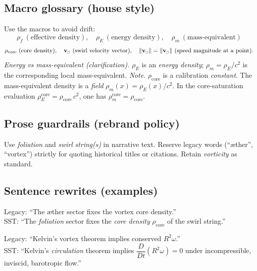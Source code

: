 \documentclass[11pt]{article}
\newcommand{\swirlarrow}{%
	\mathchoice{\mkern-2mu\scriptstyle\boldsymbol{\circlearrowleft}}%
	{\mkern-2mu\scriptstyle\boldsymbol{\circlearrowleft}}%
	{\mkern-2mu\scriptscriptstyle\boldsymbol{\circlearrowleft}}%
	{\mkern-2mu\scriptscriptstyle\boldsymbol{\circlearrowleft}}%
}
\newcommand{\vswirl}{\mathbf{v}_{\swirlarrow}}
\newcommand{\vnorm}{\lVert \mathbf{v}_{\mkern-2mu\scriptscriptstyle\boldsymbol{\circlearrowleft}} \rVert}               %
\newcommand{\rhoF}{\rho_{\!f}}                           %
\newcommand{\rhoE}{\rho_{\!E}}                           %
\newcommand{\rhoM}{\rho_{\!m}}                           %
\newcommand{\rhoC}{\rho_{\mathrm{core}}}                 %
\newcommand{\CoreSaturationNote}{%
	\textit{Note.} \(\rho_{\mathrm{core}}\) is a calibration \emph{constant}. The mass-equivalent density is a \emph{field} \(\rho_{\!m}(x)=\rho_{\!E}(x)/c^2\).
	In the core-saturation evaluation \(\rho_{\!E}^{\text{core}}=\rho_{\mathrm{core}}\,c^2\), one has \(\rho_{\!m}^{\text{core}}=\rho_{\mathrm{core}}\).}
\begin{document}
    \subsection*{Macro glossary (house style)}
        Use the macros to avoid drift:
        \[
            \rhoF\ (\text{effective density}),\quad
            \rhoE\ (\text{energy density}),\quad
            \rhoM\ (\text{mass-equivalent})
        \]\[
              \rhoC\ (\text{core density}),\quad
              \vswirl\ (\text{swirl velocity vector}),\quad
              \vnorm=\lVert\vswirl\rVert\ (\text{speed magnitude at a point}) .
    \]
        \medskip
        \noindent\textit{Energy vs mass-equivalent (clarification).} \(\rhoE\) is an \emph{energy density}; \(\rhoM=\rhoE/c^2\) is the corresponding local mass-equivalent. \CoreSaturationNote

    \subsection*{Prose guardrails (rebrand policy)}
        Use \emph{foliation} and \emph{swirl string(s)} in narrative text. Reserve legacy words (``æther'', ``vortex'') strictly for quoting historical titles or citations. Retain \emph{vorticity} as standard.

    \subsection*{Sentence rewrites (examples)}
        Legacy: “The æther sector fixes the vortex core density.”\\
        SST: “The \emph{foliation} sector fixes the \emph{core density} $\rhoC$ of the swirl string.”

        Legacy: “Kelvin’s vortex theorem implies conserved $R^2\omega$.”\\
        SST: “Kelvin’s \emph{circulation} theorem implies $\dfrac{D}{Dt}(R^2\omega)=0$ under incompressible, inviscid, barotropic flow.”

\end{document}
